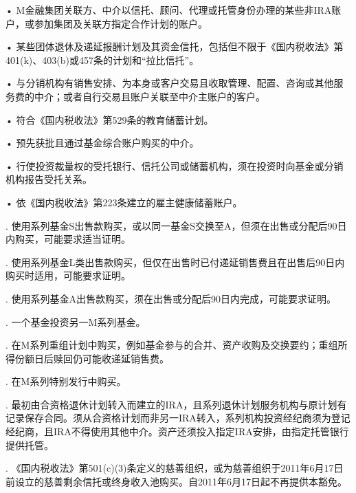 \documentclass[UTF8,fontset=none,11pt,a4paper]{ctexart}
\begin{document}
\noindent • M金融集团关联方、中介以信托、顾问、代理或托管身份办理的某些非IRA账户，或参加集团及关联方指定合作计\allowbreak\mbox{划的账户。}\par\smallskip
\noindent • 某些团体退休及递延报酬计划及其资金信托，包括但不限于《国内税收法》第401(k)、403(b)或457条的计划和“\allowbreak\mbox{拉比信托”。}\par\smallskip
\noindent • 与分销机构有销售安排、为本身或客户交易且收取管理、配置、咨询或其他服务费的中介；或者自行交易且账户关联至中介主账\allowbreak\mbox{户的客户。}\par\smallskip
\noindent • 符合《国内税收法》第529条的教育\allowbreak\mbox{储蓄计划。}\par\smallskip
\noindent • 预先获批且通过基金综合账户购\allowbreak\mbox{买的中介。}\par\smallskip
\noindent • 行使投资裁量权的受托银行、信托公司或储蓄机构，须在投资时向基金或分销机构报告\allowbreak\mbox{受托关系。}\par\smallskip
\noindent • 依《国内税收法》第223条建立的雇主健康\allowbreak\mbox{储蓄账户。}\par\smallskip
{}. 使用系列基金S出售款购买，或以同一基金S交换至A，但须在出售或分配后90日内购买，可能要求\allowbreak\mbox{适当证明。}


. 使用系列基金L类出售款购买，但仅在出售时已付递延销售费且在出售后90日内购买时适用，可能\allowbreak\mbox{要求证明。}


. 使用系列基金A出售款购买，须在出售或分配后90日内完成，可能\allowbreak\mbox{要求证明。}


. 一个基金投资另一M\allowbreak\mbox{系列基金。}


. 在M系列重组计划中购买，例如基金参与的合并、资产收购及交换要约；重组所得份额日后赎回仍可能收递\allowbreak\mbox{延销售费。}


. 在M系列特别发\allowbreak\mbox{行中购买。}


. 最初由合资格退休计划转入而建立的IRA，且系列退休计划服务机构与原计划有记录保存合同。须从合资格计划而非另一IRA转入，系列机构投资经纪商须为登记经纪商，且IRA不得使用其他中介。资产还须投入指定IRA安排，由指定托管银行\allowbreak\mbox{提供托管。}


. 《国内税收法》第501(c)(3)条定义的慈善组织，或为慈善组织于2011年6月17日前设立的慈善剩余信托或终身收入池购买。自2011年6月17日起不再提\allowbreak\mbox{供本豁免。}



\par{}\label{originalpage16}
\end{document}
